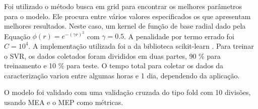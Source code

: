 Foi utilizado o método busca em grid para encontrar os melhores parâmetros para o modelo. Ele procura entre vários valores especificados os que apresentam melhores resultados. Neste caso, um kernel de função de base radial  dado pela Equação $\phi(r)=e^{-(\gamma r)^2}$ com $\gamma=0.5$. A penalidade por termo errado foi $C=10^4$. A implementação utilizada foi a da biblioteca scikit-learn \cite{scikit-learn}. Para treinar o SVR, os dados coletados foram divididos em duas partes, 90 \% para treinamento e 10 \% para teste. O tempo total para coletar os dados da caracterização variou entre algumas horas e 1 dia, dependendo da aplicação.


O modelo foi validado com uma validação cruzada do tipo fold com 10 divisões, usando MEA e o MEP como métricas.